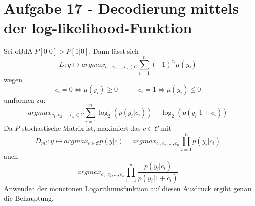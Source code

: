 \section*{Aufgabe 17 - Decodierung mittels der log-likelihood-Funktion}
	\noindent Sei oBdA $P[0|0] > P[1|0]$. Dann lässt sich
	\[ D : y \mapsto argmax_{c_{1},c_{2},\dots,c_{n}\in\mathcal{C}} \sum_{i=1}^{n} (-1)^{c_{i}} \mu(y_{i}) \]
	wegen
	\[ c_{i} = 0 \Leftrightarrow \mu(y_{i}) \geq 0 \quad \quad \quad c_{i} = 1 \Leftrightarrow \mu(y_{i}) \leq 0 \]
	umformen zu:
	\[ argmax_{c_{1},c_{2},\dots,c_{n}\in\mathcal{C}} \sum_{i=1}^{n} \log_{2}(p(y_{i}|c_{i})) - \log_{2}(p(y_{i}|1+c_{i})) \]
	Da $P$ stochastische Matrix ist, maximiert das $c \in \mathcal{C}$ mit
	\[ D_{ml} : y \mapsto argmax_{c\in\mathcal{C}} p(y|c) = argmax_{c_{1},c_{2},\dots,c_{n}} \prod_{i=1}^{n} p(y_{i}|c_{i}) \]
	auch
	\[ argmax_{c_{1},c_{2},\dots,c_{n}} \prod_{i=1}^{n} \frac{p(y_{i}|c_{i})}{p(y_{i}|1+c_{i})} \]
	Anwenden der monotonen Logarithmusfunktion auf diesen Ausdruck ergibt genau die Behauptung.
